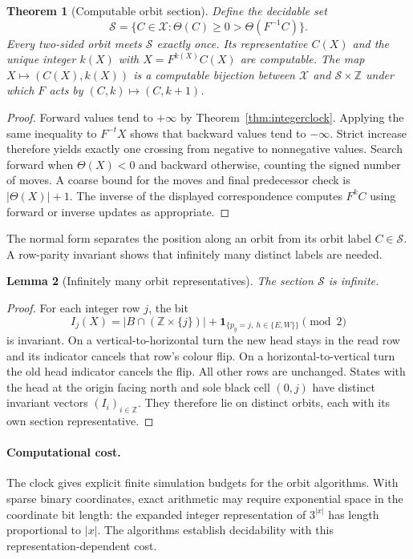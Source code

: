 \documentclass[11pt,a4paper]{article}
\newtheorem{theorem}{Theorem}[section]
\newtheorem{lemma}[theorem]{Lemma}
\theoremstyle{remark}\newtheorem{remark}[theorem]{Remark}
\newcommand{\Z}{\mathbb Z}\newcommand{\N}{\mathbb N}\newcommand{\Q}{\mathbb Q}
\begin{document}
\begin{theorem}[Computable orbit section]\label{thm:section}
Define the decidable set
\[
 \mathcal S=\{C\in\mathcal X:\Theta(C)\ge0>\Theta(F^{-1}C)\}.
\]
Every two-sided orbit meets $\mathcal S$ exactly once. Its representative $C(X)$
and the unique integer $k(X)$ with $X=F^{k(X)}C(X)$ are computable. The map
$X\mapsto(C(X),k(X))$ is a computable bijection between $\mathcal X$ and
$\mathcal S\times\Z$ under which $F$ acts by $(C,k)\mapsto(C,k+1)$.
\end{theorem}
\begin{proof}
Forward values tend to $+\infty$ by Theorem~\ref{thm:integerclock}. Applying the same inequality
to $F^{-t}X$ shows that backward values tend to $-\infty$. Strict increase
therefore yields exactly one crossing from negative to nonnegative values.
Search forward when $\Theta(X)<0$ and backward otherwise, counting the signed
number of moves. A coarse bound for the moves and final predecessor check is
$|\Theta(X)|+1$. The inverse of the displayed correspondence
computes $F^kC$ using forward or inverse updates as appropriate.
\end{proof}

The normal form separates the position along an orbit from its orbit label
$C\in\mathcal S$. A row-parity invariant shows that infinitely many distinct
labels are needed.

\begin{lemma}[Infinitely many orbit representatives]
The section $\mathcal S$ is infinite.
\end{lemma}
\begin{proof}
For each integer row $j$, the bit
\[
 I_j(X)=|B\cap(\Z\times\{j\})|
        +\mathbf1_{\{p_y=j,\ h\in\{E,W\}\}}\pmod2
\]
is invariant. On a vertical-to-horizontal turn the new head stays in the
read row and its indicator cancels that row's colour flip. On a
horizontal-to-vertical turn the old head indicator cancels the flip.
All other rows are unchanged. States with the head at the origin facing north
and sole black cell $(0,j)$ have distinct invariant vectors $(I_i)_{i\in\Z}$.
They therefore lie on distinct orbits, each with its own section representative.
\end{proof}

\paragraph{Computational cost.}
The clock gives explicit finite simulation budgets for the orbit algorithms.
With sparse binary coordinates, exact arithmetic may require exponential
space in the coordinate bit length: the expanded integer representation of
$3^{|x|}$ has length proportional to $|x|$. The algorithms establish decidability
with this representation-dependent cost.
\end{document}
